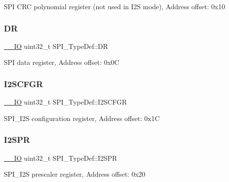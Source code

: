 S\+PI C\+RC polynomial register (not used in I2S mode), Address offset\+: 0x10 \mbox{\label{struct_s_p_i___type_def_a02ef206dd5bb270e1f17fedd71284422}} 
\subsubsection{\texorpdfstring{DR}{DR}}
{\footnotesize\ttfamily \hyperlink{core__sc300_8h_aec43007d9998a0a0e01faede4133d6be}{\+\_\+\+\_\+\+IO} uint32\+\_\+t S\+P\+I\+\_\+\+Type\+Def\+::\+DR}

S\+PI data register, Address offset\+: 0x0C \mbox{\label{struct_s_p_i___type_def_a4a1547c0ed26f31108910c35d2876b83}} 
\subsubsection{\texorpdfstring{I2\+S\+C\+F\+GR}{I2SCFGR}}
{\footnotesize\ttfamily \hyperlink{core__sc300_8h_aec43007d9998a0a0e01faede4133d6be}{\+\_\+\+\_\+\+IO} uint32\+\_\+t S\+P\+I\+\_\+\+Type\+Def\+::\+I2\+S\+C\+F\+GR}

S\+P\+I\+\_\+\+I2S configuration register, Address offset\+: 0x1C \mbox{\label{struct_s_p_i___type_def_aff2f386a2566c722f7962377b495f1a2}} 
\subsubsection{\texorpdfstring{I2\+S\+PR}{I2SPR}}
{\footnotesize\ttfamily \hyperlink{core__sc300_8h_aec43007d9998a0a0e01faede4133d6be}{\+\_\+\+\_\+\+IO} uint32\+\_\+t S\+P\+I\+\_\+\+Type\+Def\+::\+I2\+S\+PR}

S\+P\+I\+\_\+\+I2S prescaler register, Address offset\+: 0x20 \mbox{\label{struct_s_p_i___type_def_a60f1f0e77c52e89cfd738999bee5c9d0}} 
